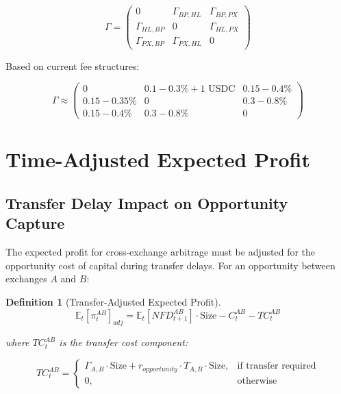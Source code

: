 \documentclass{article}
\newtheorem{definition}{Definition}
\begin{document}
\begin{equation}
\Gamma = \begin{pmatrix}
0 & \Gamma_{BP,HL} & \Gamma_{BP,PX} \\
\Gamma_{HL,BP} & 0 & \Gamma_{HL,PX} \\
\Gamma_{PX,BP} & \Gamma_{PX,HL} & 0
\end{pmatrix}
\end{equation}

Based on current fee structures:

\begin{equation}
\Gamma \approx \begin{pmatrix}
0 & 0.1-0.3\% + 1\text{ USDC} & 0.15-0.4\% \\
0.15-0.35\% & 0 & 0.3-0.8\% \\
0.15-0.4\% & 0.3-0.8\% & 0
\end{pmatrix}
\end{equation}

\section{Time-Adjusted Expected Profit}

\subsection{Transfer Delay Impact on Opportunity Capture}

The expected profit for cross-exchange arbitrage must be adjusted for the opportunity cost of capital during transfer delays. For an opportunity between exchanges $A$ and $B$:

\begin{definition}[Transfer-Adjusted Expected Profit]
\begin{equation}
\mathbb{E}_t[\pi^{AB}_t]_{adj} = \mathbb{E}_t[NFD^{AB}_{t+1}] \cdot \text{Size} - C^{AB}_t - TC^{AB}_t
\end{equation}

where $TC^{AB}_t$ is the transfer cost component:

\begin{equation}
TC^{AB}_t = \begin{cases}
\Gamma_{A,B} \cdot \text{Size} + r_{opportunity} \cdot T_{A,B} \cdot \text{Size}, & \text{if transfer required} \\
0, & \text{otherwise}
\end{cases}
\end{equation}
\end{definition}
\end{document}
